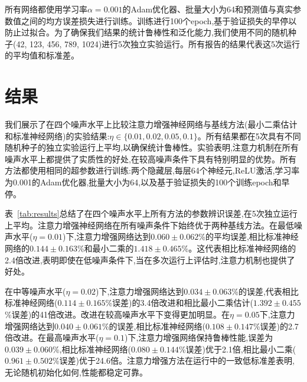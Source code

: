 \documentclass[Afour,sageh,times]{sagej}
\begin{document}
所有网络都使用学习率$\alpha = 0.001$的Adam优化器、批量大小为64和预测值与真实参数值之间的均方误差损失进行训练。训练进行100个epoch,基于验证损失的早停以防止过拟合。为了确保我们结果的统计鲁棒性和泛化能力,我们使用不同的随机种子(42, 123, 456, 789, 1024)进行5次独立实验运行。所有报告的结果代表这5次运行的平均值和标准差。

\section{结果}
\label{sec:results}

我们展示了在四个噪声水平上比较注意力增强神经网络与基线方法(最小二乘估计和标准神经网络)的实验结果:$\eta \in \{0.01, 0.02, 0.05, 0.1\}$。所有结果都在5次具有不同随机种子的独立实验运行上平均,以确保统计鲁棒性。实验表明,注意力机制在所有噪声水平上都提供了实质性的好处,在较高噪声条件下具有特别明显的优势。所有方法都使用相同的超参数进行训练:两个隐藏层,每层64个神经元,ReLU激活,学习率为0.001的Adam优化器,批量大小为64,以及基于验证损失的100个训练epoch和早停。

表~\ref{tab:results}总结了在四个噪声水平上所有方法的参数辨识误差,在5次独立运行上平均。注意力增强神经网络在所有噪声条件下始终优于两种基线方法。在最低噪声水平($\eta = 0.01$)下,注意力增强网络达到$0.060 \pm 0.062$\%的平均误差,相比标准神经网络的$0.144 \pm 0.163$\%和最小二乘的$1.418 \pm 0.465$\%。这代表相比标准神经网络的2.4倍改进,表明即使在低噪声条件下,当在多次运行上评估时,注意力机制也提供了好处。

在中等噪声水平($\eta = 0.02$)下,注意力增强网络达到$0.034 \pm 0.063$\%的误差,代表相比标准神经网络($0.114 \pm 0.165$\%误差)的3.4倍改进和相比最小二乘估计($1.392 \pm 0.455$\%误差)的41倍改进。改进在较高噪声水平下变得更加明显。在$\eta = 0.05$下,注意力增强网络达到$0.040 \pm 0.061$\%的误差,相比标准神经网络($0.108 \pm 0.147$\%误差)的2.7倍改进。在最高噪声水平($\eta = 0.1$)下,注意力增强网络保持鲁棒性能,误差为$0.039 \pm 0.060$\%,相比标准神经网络($0.080 \pm 0.144$\%误差)优于2.1倍,相比最小二乘($0.961 \pm 0.502$\%误差)优于24.6倍。注意力增强方法在运行中的一致低标准差表明,无论随机初始化如何,性能都稳定可靠。

\begin{table}[t]
\small\sf\centering
\caption{不同噪声水平下的参数辨识误差(\%)。结果在5次具有不同随机种子的独立运行上平均。值显示为平均值$\pm$标准差。较低的值表示更好的性能。}
\label{tab:results}
\end{table}
\end{document}
